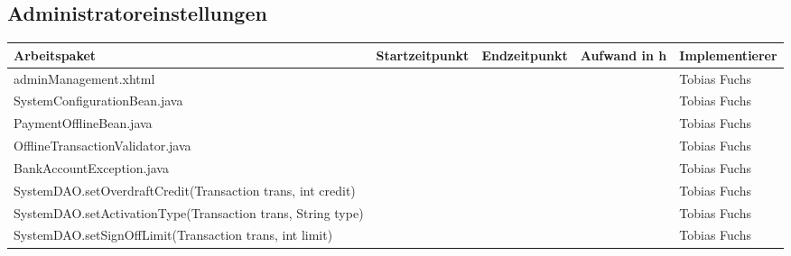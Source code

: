 \begin{landscape}
	\subsection{Administratoreinstellungen}
	\begin{tabular}{|p{10cm}|p{4cm}|p{3cm}|p{3cm}|p{3cm}|}
		\hline  \textbf{Arbeitspaket} & \textbf{Startzeitpunkt} & \textbf{Endzeitpunkt} & \textbf{Aufwand in h} & \textbf{Implementierer} \\ 
		\hline   adminManagement.xhtml                                 &                            &                             &                     & Tobias Fuchs\\
		\hline   SystemConfigurationBean.java                          &                            &                             &                     & Tobias Fuchs\\
		\hline   PaymentOfflineBean.java                               &                            &                             &                     & Tobias Fuchs \\
		\hline   OfflineTransactionValidator.java                      &                            &                             &                     & Tobias Fuchs\\
		\hline   BankAccountException.java                             &                            &                             &                     & Tobias Fuchs\\
		\hline   SystemDAO.setOverdraftCredit(Transaction trans, int credit)                  &                            &                             &                     & Tobias Fuchs\\
		\hline   SystemDAO.setActivationType(Transaction trans, String type)                  &                            &                             &                     & Tobias Fuchs\\
		\hline   SystemDAO.setSignOffLimit(Transaction trans, int limit)                      &                            &                             &                     & Tobias Fuchs\\
		\hline 
	\end{tabular} \ \\
	\ \\
	

\end{landscape}
